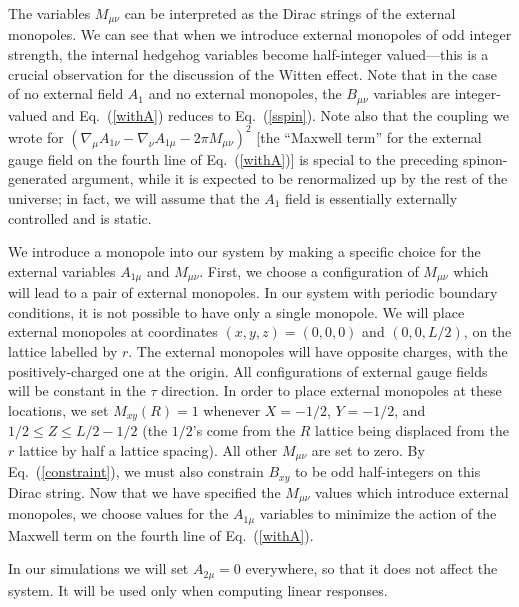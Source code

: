 The variables $M_{\mu\nu}$ can be interpreted as the Dirac strings of the external monopoles. We can see that when we introduce external monopoles of odd integer strength, the internal hedgehog variables become half-integer valued---this is a crucial observation for the discussion of the Witten effect.\cite{Max}  Note that in the case of no external field $A_1$ and no external monopoles, the $B_{\mu\nu}$ variables are integer-valued and Eq.~(\ref{withA}) reduces to Eq.~(\ref{sspin}).  Note also that the coupling we wrote for $(\nabla_\mu A_{1\nu}-\nabla_\nu A_{1\mu}-2\pi M_{\mu\nu})^2$ [the ``Maxwell term'' for the external gauge field on the fourth line of Eq.~(\ref{withA})] is special to the preceding spinon-generated argument, while it is expected to be renormalized up by the rest of the universe; in fact, we will assume that the $A_1$ field is essentially externally controlled and is static.

We introduce a monopole into our system by making a specific choice for the external variables $A_{1\mu}$ and $M_{\mu\nu}$. First, we choose a configuration of $M_{\mu\nu}$ which will lead to a pair of external monopoles. In our system with periodic boundary conditions, it is not possible to have only a single monopole. We will place external monopoles at coordinates $(x,y,z)=(0,0,0)$ and $(0,0,L/2)$, on the lattice labelled by $r$. The external monopoles will have opposite charges, with the positively-charged one at the origin. All configurations of external gauge fields will be constant in the $\tau$ direction. In order to place external monopoles at these locations, we set $M_{xy}(R)=1$ whenever $X=-1/2$, $Y=-1/2$, and $1/2 \leq Z \leq L/2-1/2$ (the $1/2$'s come from the $R$ lattice being displaced from the $r$ lattice by half a lattice spacing). All other $M_{\mu\nu}$ are set to zero. By Eq.~(\ref{constraint}), we must also constrain $B_{xy}$ to be odd half-integers on this Dirac string. Now that we have specified the $M_{\mu\nu}$ values which introduce external monopoles, we choose values for the $A_{1\mu}$ variables to minimize the action of the Maxwell term on the fourth line of Eq.~(\ref{withA}). 

In our simulations we will set $A_{2\mu}=0$ everywhere, so that it does not affect the system. It will be used only when computing linear responses. 

